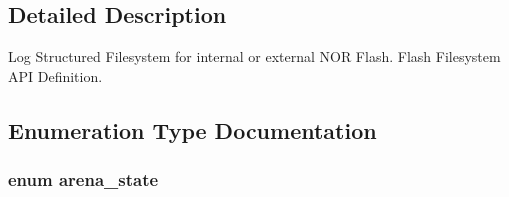 \subsection{Detailed Description}
Log Structured Filesystem for internal or external N\-O\-R Flash. Flash Filesystem A\-P\-I Definition.

\subsection{Enumeration Type Documentation}
\hypertarget{group___p_i_o_s___f_l_a_s_h_f_s_gaa936149cfd5559190d20879c10e0fcee}{
\subsubsection[{arena\-\_\-state}]{\setlength{\rightskip}{0pt plus 5cm}enum {\bf arena\-\_\-state}}}\label{group___p_i_o_s___f_l_a_s_h_f_s_gaa936149cfd5559190d20879c10e0fcee}
